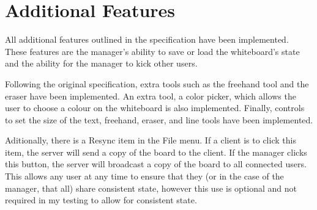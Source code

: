 \documentclass[12pt]{article}
\begin{document}
\section{Additional Features}
All additional features outlined in the specification have been implemented. These features are the manager's ability to save or load the whiteboard's state and the ability for the manager to kick other users. 

Following the original specification, extra tools such as the freehand tool and the eraser have been implemented. An extra tool, a color picker, which allows the user to choose a colour on the whiteboard is also implemented. Finally, controls to set the size of the text, freehand, eraser, and line tools have been implemented.

Aditionally, there is a Resync item in the File menu. If a client is to click this item, the server will send a copy of the board to the client. If the manager clicks this button, the server will broadcast a copy of the board to all connected users. This allows any user at any time to ensure that they (or in the case of the manager, that all) share consistent state, however this use is optional and not required in my testing to allow for consistent state.
\end{document}
